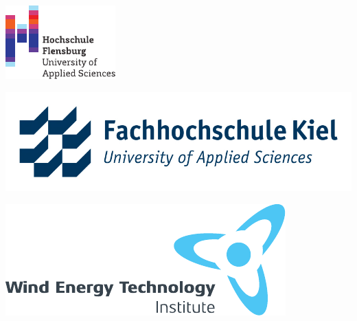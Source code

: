 \thispagestyle{empty} %
\begin{center}
    \begin{minipage}[c]{0.25\textwidth}
        \includegraphics[width=\textwidth]{Figures/00_other/FUAS.pdf}
        \end{minipage}
        \begin{minipage}[c]{0.35\textwidth}
        \includegraphics[width=\textwidth]{Figures/00_other/FHKiel.jpg}
        \end{minipage}
        \begin{minipage}[c]{0.35\textwidth}
        \includegraphics[width=\textwidth]{Figures/00_other/WETI.pdf}
        \end{minipage}


\end{center}
